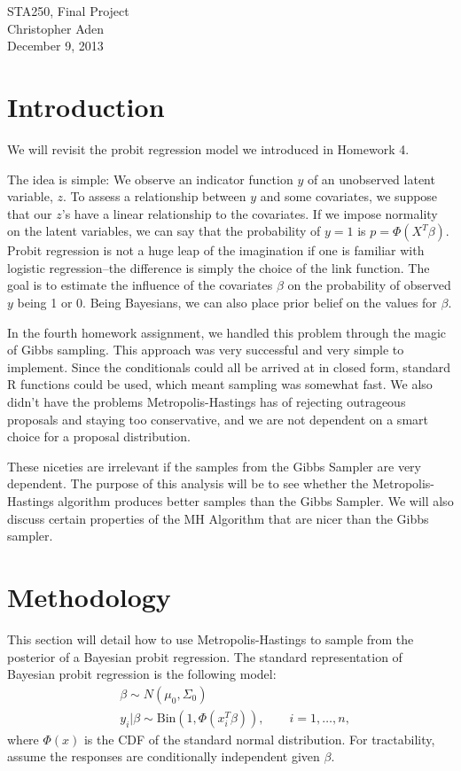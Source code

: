 \documentclass[12pt]{article}
\begin{document}
\begin{center}
STA250, Final Project \\
Christopher Aden\\
December 9, 2013\
\end{center}

\section{Introduction}
We will revisit the probit regression model we introduced in Homework 4. 

The idea is simple: We observe an indicator function $y$ of an unobserved latent variable, $z$. To assess a relationship between $y$ and some covariates, we suppose that our $z$'s have a linear relationship to the covariates. If we impose normality on the latent variables, we can say that the probability of $y=1$ is $p = \Phi(X^T \beta)$. Probit regression is not a huge leap of the imagination if one is familiar with logistic regression--the difference is simply the choice of the link function. The goal is to estimate the influence of the covariates $\beta$ on the probability of observed $y$ being 1 or 0. Being Bayesians, we can also place prior belief on the values for $\beta$.

In the fourth homework assignment, we handled this problem through the magic of Gibbs sampling. This approach was very successful and very simple to implement. Since the conditionals could all be arrived at in closed form, standard R functions could be used, which meant sampling was somewhat fast. We also didn't have the problems Metropolis-Hastings has of rejecting outrageous proposals and staying too conservative, and we are not dependent on a smart choice for a proposal distribution.

These niceties are irrelevant if the samples from the Gibbs Sampler are very dependent. The purpose of this analysis will be to see whether the Metropolis-Hastings algorithm produces better samples than the Gibbs Sampler. We will also discuss certain properties of the MH Algorithm that are nicer than the Gibbs sampler. 

\section{Methodology}
This section will detail how to use Metropolis-Hastings to sample from the posterior of a Bayesian probit regression. The standard representation of Bayesian probit regression is the following model:
\begin{align*}
& \beta \sim N(\mu_0, \Sigma_0) \\
& y_{i} | \beta \sim \textrm{Bin}(1,\Phi(x_{i}^{T}\beta)) , \qquad i=1, \ldots, n,
\end{align*}
where $\Phi(x)$ is the CDF of the standard normal distribution. For tractability, assume the responses are conditionally independent given $\beta$.
\end{document}

